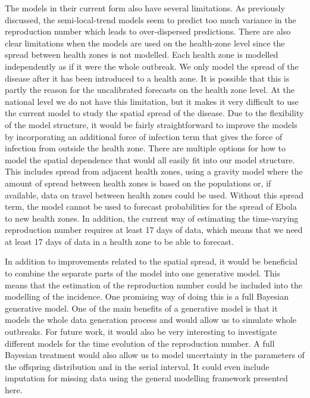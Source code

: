 \documentclass[12pt]{article}
\begin{document}
The models in their current form also have several limitations. As previously discussed, the semi-local-trend models seem to predict too much variance in the reproduction number which leads to over-dispersed predictions. There are also clear limitations when the models are used on the health-zone level since the spread between health zones is not modelled. Each health zone is modelled independently as if it were the whole outbreak. We only model the spread of the disease after it has been introduced to a health zone. It is possible that this is partly the reason for the uncalibrated forecasts on the health zone level. At the national level we do not have this limitation, but it makes it very difficult to use the current model to study the spatial spread of the disease. Due to the flexibility of the model structure, it would be fairly straightforward to improve the models by incorporating an additional force of infection term that gives the force of infection from outside the health zone. There are multiple options for how to model the spatial dependence that would all easily fit into our model structure. This includes spread from adjacent health zones, using a gravity model where the amount of spread between health zones is based on the populations \cite{haynesGravitySpatialInteraction1985} or, if available, data on travel between health zones could be used. Without this spread term, the model cannot be used to forecast probabilities for the spread of Ebola to new health zones. In addition, the current way of estimating the time-varying reproduction number requires at least 17 days of data, which means that we need at least 17 days of data in a health zone to be able to forecast.

In addition to improvements related to the spatial spread, it would be beneficial to combine the separate parts of the model into one generative model. This means that the estimation of the reproduction number could be included into the modelling of the incidence. One promising way of doing this is a full Bayesian generative model. One of the main benefits of a generative model is that it models the whole data generation process and would allow us to simulate whole outbreaks. For future work, it would also be very interesting to investigate different models for the time evolution of the reproduction number. A full Bayesian treatment would also allow us to model uncertainty in the parameters of the offspring distribution and in the serial interval. It could even include imputation for missing data using the general modelling framework presented here.
\end{document}
